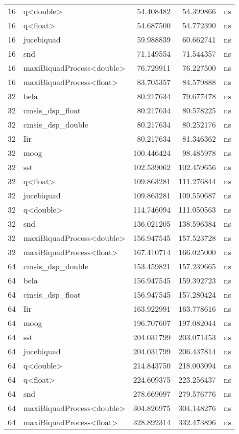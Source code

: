 \begin{tabular}{rlrrl}
16 & q<double> & 54.408482 & 54.399866 & ns \\
16 & q<float> & 54.687500 & 54.772390 & ns \\
16 & jucebiquad & 59.988839 & 60.662741 & ns \\
16 & snd & 71.149554 & 71.544357 & ns \\
16 & maxiBiquadProcess<double> & 76.729911 & 76.227500 & ns \\
16 & maxiBiquadProcess<float> & 83.705357 & 84.579888 & ns \\
32 & bela & 80.217634 & 79.677478 & ns \\
32 & cmsis\_dsp\_float & 80.217634 & 80.578225 & ns \\
32 & cmsis\_dsp\_double & 80.217634 & 80.252176 & ns \\
32 & Iir & 80.217634 & 81.346362 & ns \\
32 & moog & 100.446424 & 98.485978 & ns \\
32 & sst & 102.539062 & 102.459656 & ns \\
32 & q<float> & 109.863281 & 111.276844 & ns \\
32 & jucebiquad & 109.863281 & 109.550687 & ns \\
32 & q<double> & 114.746094 & 111.050563 & ns \\
32 & snd & 136.021205 & 138.596384 & ns \\
32 & maxiBiquadProcess<double> & 156.947545 & 157.523728 & ns \\
32 & maxiBiquadProcess<float> & 167.410714 & 166.025000 & ns \\
64 & cmsis\_dsp\_double & 153.459821 & 157.239665 & ns \\
64 & bela & 156.947545 & 159.392723 & ns \\
64 & cmsis\_dsp\_float & 156.947545 & 157.280424 & ns \\
64 & Iir & 163.922991 & 163.778616 & ns \\
64 & moog & 196.707607 & 197.082044 & ns \\
64 & sst & 204.031799 & 203.071453 & ns \\
64 & jucebiquad & 204.031799 & 206.437814 & ns \\
64 & q<double> & 214.843750 & 218.003094 & ns \\
64 & q<float> & 224.609375 & 223.256437 & ns \\
64 & snd & 278.669097 & 279.576776 & ns \\
64 & maxiBiquadProcess<double> & 304.826975 & 304.148276 & ns \\
64 & maxiBiquadProcess<float> & 328.892314 & 332.473896 & ns \\
\bottomrule
\end{tabular}
